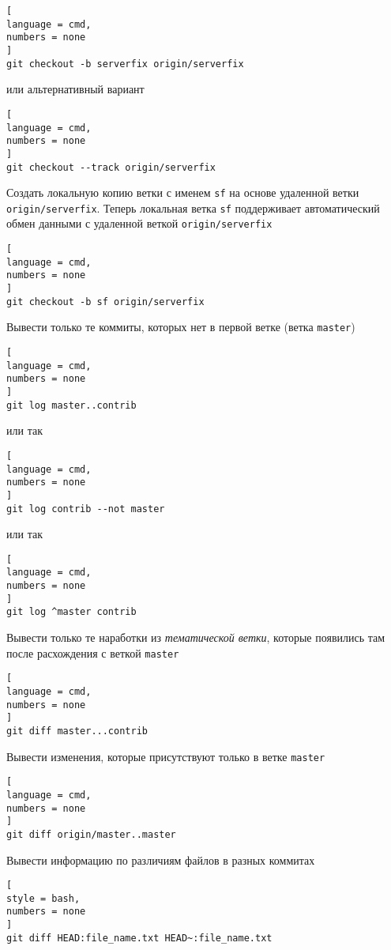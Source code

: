 \documentclass[%
	11pt,
	a4paper,
	utf8,
		]{article}
\begin{document}
\begin{lstlisting}[
language = cmd,
numbers = none
]
git checkout -b serverfix origin/serverfix
\end{lstlisting}

\noindent или альтернативный вариант

\begin{lstlisting}[
language = cmd,
numbers = none
]
git checkout --track origin/serverfix
\end{lstlisting}

Создать локальную копию ветки с именем \texttt{sf} на основе удаленной ветки \texttt{origin/serverfix}. Теперь локальная ветка \texttt{sf} поддерживает автоматический обмен данными с удаленной веткой \texttt{origin/serverfix}

\begin{lstlisting}[
language = cmd,
numbers = none
]
git checkout -b sf origin/serverfix
\end{lstlisting}


Вывести только те коммиты, которых нет в первой ветке (ветка \texttt{master})

\begin{lstlisting}[
language = cmd,
numbers = none
]
git log master..contrib
\end{lstlisting}
или так
\begin{lstlisting}[
language = cmd,
numbers = none
]
git log contrib --not master
\end{lstlisting}
или так
\begin{lstlisting}[
language = cmd,
numbers = none
]
git log ^master contrib
\end{lstlisting}


Вывести только те наработки из \emph{тематической ветки}, которые появились там после расхождения с веткой \texttt{master}

\begin{lstlisting}[
language = cmd,
numbers = none
]
git diff master...contrib
\end{lstlisting}

Вывести изменения, которые присутствуют только в ветке \texttt{master}

\begin{lstlisting}[
language = cmd,
numbers = none
]
git diff origin/master..master
\end{lstlisting}

Вывести информацию по различиям файлов в разных коммитах
\begin{lstlisting}[
style = bash,
numbers = none
]
git diff HEAD:file_name.txt HEAD~:file_name.txt
\end{lstlisting}
\end{document}
